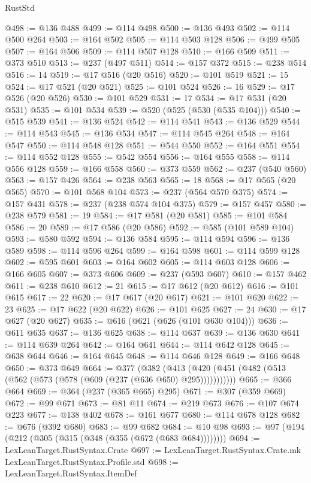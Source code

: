 \begin{lexlean}{RustStd}
\begin{coremodule}
@498 := @136 @488
@499 := @114 @498
@500 := @136 @493
@502 := @114 @500 @264
@503 := @164 @502
@505 := @114 @503 @128
@506 := @499 @505
@507 := @164 @506
@509 := @114 @507 @128
@510 := @166 @509
@511 := @373 @510
@513 := @237 (@497 @511)
@514 := @157 @372
@515 := @238 @514
@516 := 14
@519 := @17 @516 (@20 @516)
@520 := @101 @519
@521 := 15
@524 := @17 @521 (@20 @521)
@525 := @101 @524
@526 := 16
@529 := @17 @526 (@20 @526)
@530 := @101 @529
@531 := 17
@534 := @17 @531 (@20 @531)
@535 := @101 @534
@539 := @520 (@525 (@530 (@535 @104)))
@540 := @515 @539
@541 := @136 @524
@542 := @114 @541
@543 := @136 @529
@544 := @114 @543
@545 := @136 @534
@547 := @114 @545 @264
@548 := @164 @547
@550 := @114 @548 @128
@551 := @544 @550
@552 := @164 @551
@554 := @114 @552 @128
@555 := @542 @554
@556 := @164 @555
@558 := @114 @556 @128
@559 := @166 @558
@560 := @373 @559
@562 := @237 (@540 @560)
@563 := @157 @426
@564 := @238 @563
@565 := 18
@568 := @17 @565 (@20 @565)
@570 := @101 @568 @104
@573 := @237 (@564 @570 @375)
@574 := @157 @431
@578 := @237 (@238 @574 @104 @375)
@579 := @157 @457
@580 := @238 @579
@581 := 19
@584 := @17 @581 (@20 @581)
@585 := @101 @584
@586 := 20
@589 := @17 @586 (@20 @586)
@592 := @585 (@101 @589 @104)
@593 := @580 @592
@594 := @136 @584
@595 := @114 @594
@596 := @136 @589
@598 := @114 @596 @264
@599 := @164 @598
@601 := @114 @599 @128
@602 := @595 @601
@603 := @164 @602
@605 := @114 @603 @128
@606 := @166 @605
@607 := @373 @606
@609 := @237 (@593 @607)
@610 := @157 @462
@611 := @238 @610
@612 := 21
@615 := @17 @612 (@20 @612)
@616 := @101 @615
@617 := 22
@620 := @17 @617 (@20 @617)
@621 := @101 @620
@622 := 23
@625 := @17 @622 (@20 @622)
@626 := @101 @625
@627 := 24
@630 := @17 @627 (@20 @627)
@635 := @616 (@621 (@626 (@101 @630 @104)))
@636 := @611 @635
@637 := @136 @625
@638 := @114 @637
@639 := @136 @630
@641 := @114 @639 @264
@642 := @164 @641
@644 := @114 @642 @128
@645 := @638 @644
@646 := @164 @645
@648 := @114 @646 @128
@649 := @166 @648
@650 := @373 @649
@664 := @377
    (@382 (@413 (@420 (@451 (@482 (@513 (@562 (@573 (@578 (@609 (@237 (@636 @650) @295)))))))))))
@665 := @366 @664
@669 := @364 (@237 (@365 @665) @295)
@671 := @307 (@359 @669)
@672 := @99 @671
@673 := @81 @11
@674 := @219 @673
@676 := @107 @674 @223
@677 := @138 @402
@678 := @161 @677
@680 := @114 @678 @128
@682 := @676 (@392 @680)
@683 := @99 @682
@684 := @10 @98
@693 := @97 (@194 (@212 (@305 (@315 (@348 (@355 (@672 (@683 @684))))))))
@694 := LexLeanTarget.RustSyntax.Crate
@697 := LexLeanTarget.RustSyntax.Crate.mk LexLeanTarget.RustSyntax.Profile.std
@698 := LexLeanTarget.RustSyntax.ItemDef

\end{coremodule}
\end{lexlean}
